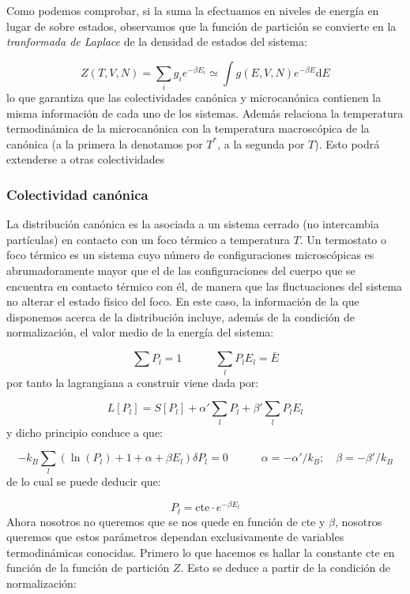 \documentclass[12pt,a4paper]{article}
\numberwithin{equation}{section}
\numberwithin{figure}{section}
\newcommand{\tquad}{\quad \quad \quad}
\newcommand{\parentesis}[1]{\left( #1  \right)}
\newcommand{\D}{\mathrm{d}}
\newcommand{\cte}{\mathrm{cte}}
\theoremstyle{definition}
\begin{document}
Como podemos comprobar, si la suma la efectuamos en niveles de energía en lugar de sobre estados, observamos que la función de partición se convierte en la \textit{tranformada de Laplace} de la densidad de estados del sistema:

\begin{equation}
Z(T,V,N) = \sum_i g_i e^{-\beta E_i} \simeq \int g(E,V,N) e^{-\beta E} \D E
\end{equation}
lo que garantiza que las colectividades canónica y microcanónica contienen la misma información de cada uno de los sistemas. Además relaciona la temperatura termodinámica de la microcanónica con la temperatura macroscópica de la canónica (a la primera la denotamos  por $T^*$, a la segunda por $T$). Esto podrá extenderse a otras colectividades

\subsubsection{Colectividad canónica}

La distribución canónica es la asociada a un sistema cerrado (no intercambia partículas) en contacto con un foco térmico a temperatura $T$. Un termostato o foco térmico es un sistema cuyo número de configuraciones microscópicas es abrumadoramente mayor que el de las configuraciones del cuerpo que se encuentra en contacto térmico con él, de manera que las fluctuaciones del sistema no alterar el estado físico del foco. En este caso, la información de la que disponemos acerca de la distribución incluye, además de la condición de normalización, el valor medio de la energía del sistema:

\begin{equation}
\sum P_l =1  \tquad \sum_l P_l E_l = \bar{E}
\end{equation}
por tanto la lagrangiana a construir viene dada por:

\begin{equation}
L[P_l] = S[P_l] + \alpha' \sum_l P_l + \beta ' \sum_l P_l E_l
\end{equation}
y dicho principio conduce a que:

\begin{equation}
- k_B \sum_l \parentesis{\ln (P_l) + 1 + \alpha + \beta E_l} \delta P_l=0 \tquad \alpha = - \alpha'/k_B; \quad \beta = - \beta'/k_B
\end{equation}
de lo cual se puede deducir que:

\begin{equation}
P_l = \cte \cdot e^{- \beta E_l}
\end{equation}
Ahora nosotros no queremos que se nos quede en función de $\cte$ y $\beta$, nosotros queremos que estos parámetros dependan exclusivamente de variables termodinámicas conocidas. Primero lo que hacemos es hallar la constante $\cte$ en función de la función de partición $Z$. Esto se deduce a partir de la condición de normalización:
\end{document}
